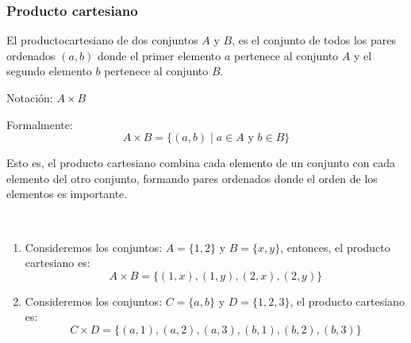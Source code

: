 \subsubsection{Producto cartesiano}
\vspace{1em}
\begin{fmd-definition}
	El \gls{productocartesiano} de dos conjuntos \(A\) y \(B\), es el conjunto de todos los pares ordenados \((a, b)\) donde el primer elemento \(a\) pertenece al conjunto \(A\) y el segundo elemento \(b\) pertenece al conjunto \(B\).

	Notación: \(A \times B\)
	
	Formalmente:
	$$A \times B = \{(a, b) \mid a \in A \text{ y } b \in B\}$$
	
	Esto es, el producto cartesiano combina cada elemento de un conjunto con cada elemento del otro conjunto, formando pares ordenados donde el orden de los elementos es importante.
\end{fmd-definition}


\begin{example}
	\
	\begin{enumerate}
		\item Consideremos los conjuntos: \(A = \{1, 2\}\) y \(B = \{x, y\}\), entonces, el producto cartesiano es:
		$$A \times B = \{(1, x), (1, y), (2, x), (2, y)\}$$
		
		\item Consideremos los conjuntos: \(C = \{a, b\}\) y \(D = \{1, 2, 3\}\), el producto cartesiano es:
		$$C \times D = \{(a, 1), (a, 2), (a, 3), (b, 1), (b, 2), (b, 3)\}$$
	\end{enumerate}
\end{example}

